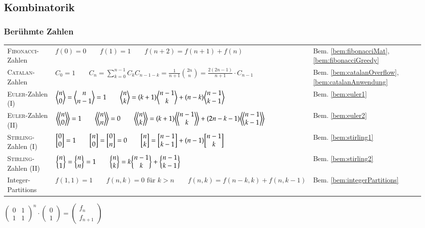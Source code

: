 \subsection{Kombinatorik}

\subsubsection{Berühmte Zahlen}
\begin{tabularx}{\textwidth}{|l|X|l|}
	\hline
	\textsc{Fibonacci}-Zahlen	&
	$f(0) = 0 \qquad
	f(1) = 1 \qquad
	f(n+2) = f(n+1) + f(n)$ &
	Bem. \ref{bem:fibonacciMat}, \ref{bem:fibonacciGreedy} \\

	\textsc{Catalan}-Zahlen	&
	$C_0 = 1 \qquad
	C_n = \sum\limits_{k = 0}^{n - 1} C_kC_{n - 1 - k} =
	\frac{1}{n + 1}\binom{2n}{n} = \frac{2(2n - 1)}{n+1} \cdot C_{n-1}$ &
	Bem. \ref{bem:catalanOverflow}, \ref{bem:catalanAnwendung} \\

	\textsc{Euler}-Zahlen (I) &
	$\biggl\langle \begin{matrix} n \\ 0 \end{matrix} \biggr\rangle = \biggl\langle \begin{matrix} n \\ n-1 \end{matrix} \biggr\rangle = 1 \qquad
	\biggl\langle \begin{matrix} n \\ k \end{matrix} \biggr\rangle = (k+1) \biggl\langle \begin{matrix} n-1 \\ k \end{matrix} \biggr\rangle + (n-k) \biggl\langle \begin{matrix} n-1 \\ k-1 \end{matrix} \biggr\rangle $ &
	Bem. \ref{bem:euler1} \\

	\textsc{Euler}-Zahlen (II) &
	$\eulerII{n}{0} = 1 \qquad
	\eulerII{n}{n} = 0 \qquad
	\eulerII{n}{k} = (k+1) \eulerII{n-1}{k} + (2n-k-1) \eulerII{n-1}{k-1}$ &
	Bem. \ref{bem:euler2} \\

	\textsc{Stirling}-Zahlen (I) &
	$\biggl[ \begin{matrix} 0 \\ 0 \end{matrix} \biggr] = 1 \qquad
	\biggl[ \begin{matrix} n \\ 0 \end{matrix} \biggr] = \biggl[ \begin{matrix} 0 \\ n \end{matrix} \biggr] = 0 \qquad
	\biggl[ \begin{matrix} n \\ k \end{matrix} \biggr] = \biggl[ \begin{matrix} n-1 \\ k-1 \end{matrix} \biggr] + (n-1) \biggl[ \begin{matrix} n-1 \\ k \end{matrix} \biggr]$ &
	Bem. \ref{bem:stirling1} \\

	\textsc{Stirling}-Zahlen (II) &
	$\biggl\{ \begin{matrix} n \\ 1 \end{matrix} \biggr\} = \biggl\{ \begin{matrix} n \\ n \end{matrix} \biggr\} = 1 \qquad
	\biggl\{ \begin{matrix} n \\ k \end{matrix} \biggr\} = k \biggl\{ \begin{matrix} n-1 \\ k \end{matrix} \biggr\} + \biggl\{ \begin{matrix} n-1 \\ k-1 \end{matrix} \biggr\}$ &
	Bem. \ref{bem:stirling2} \\

	Integer-Partitions &
	$f(1,1) = 1 \qquad f(n,k) = 0 \text{ für } k > n \qquad f(n,k)  =
	f(n-k,k) + f(n,k-1)$ &
	Bem. \ref{bem:integerPartitions} \\
	\hline
\end{tabularx}

\begin{bem}\label{bem:fibonacciMat}
	$
	\begin{pmatrix} 0 & 1 \\ 1 & 1 \end{pmatrix}^n
	\cdot
	\begin{pmatrix} 0 \\ 1 \end{pmatrix}
	=
	\begin{pmatrix}f_n \\ f_{n+1} \end{pmatrix}
	$
\end{bem}

